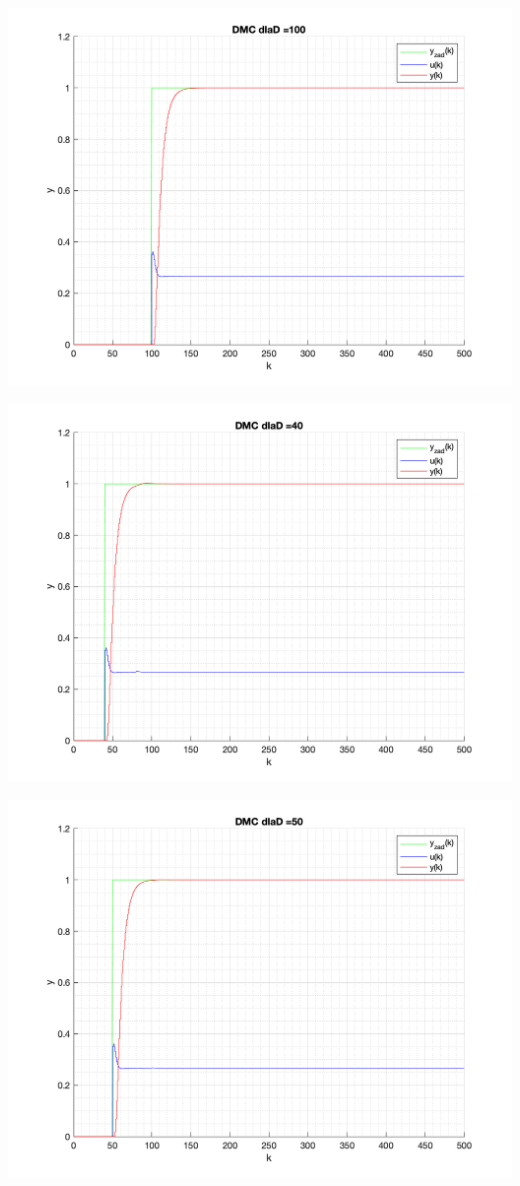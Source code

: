 \documentclass[a4paper, 11pt]{article}
\begin{document}
\begin{enumerate}
 \includegraphics[width=\linewidth]{./ModelsP4_D/P4_DMC_D_100_png.png} 
 
 \includegraphics[width=\linewidth]{./ModelsP4_D/P4_DMC_D_40_png.png} 
 
 \includegraphics[width=\linewidth]{./ModelsP4_D/P4_DMC_D_50_png.png} 
 

\end{enumerate}
\end{document}
